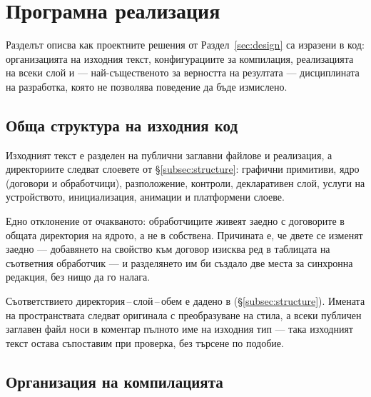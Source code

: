 %
\section{Програмна реализация}
\label{sec:implementation}

Разделът описва как проектните решения от Раздел~\ref{sec:design} са изразени в код:
организацията на изходния текст, конфигурациите за компилация, реализацията на всеки
слой и --- най-същественото за верността на резултата --- дисциплината на разработка,
която не позволява поведение да бъде измислено.

\subsection{Обща структура на изходния код}
\label{subsec:code_structure}

Изходният текст е разделен на публични заглавни файлове и реализация, а директориите
следват слоевете от §\ref{subsec:structure}: графични примитиви, ядро (договори и
обработчици), разположение, контроли, декларативен слой, услуги на устройството,
инициализация, анимации и платформени слоеве.

Едно отклонение от очакваното: обработчиците живеят заедно с договорите в общата
директория на ядрото, а не в собствена. Причината е, че двете се изменят заедно ---
добавянето на свойство към договор изисква ред в таблицата на съответния обработчик ---
и разделянето им би създало две места за синхронна редакция, без нищо да го налага.

Съответствието директория\,--\,слой\,--\,обем е дадено в 
(§\ref{subsec:structure}). Имената на пространствата следват оригинала с преобразуване на
стила, а всеки публичен заглавен файл носи в коментар пълното име на изходния тип --- така
изходният текст остава съпоставим при проверка, без търсене по подобие.

\subsection{Организация на компилацията}
\label{subsec:build}

